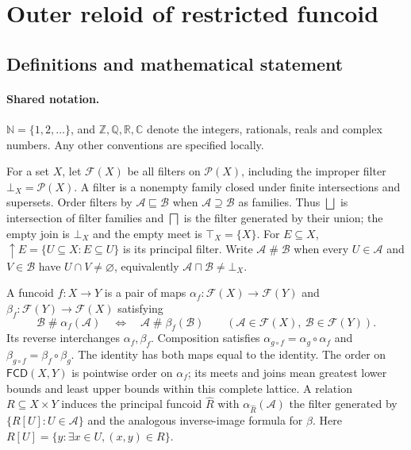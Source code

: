 \documentclass[11pt]{article}
\begin{document}
\section{Outer reloid of restricted funcoid}\label{statement}

\subsection{Definitions and mathematical statement}

\paragraph{Shared notation.}$\mathbb N=\{1,2,\ldots\}$, and $\mathbb Z,\mathbb Q,\mathbb R,\mathbb C$ denote the integers, rationals, reals and complex numbers. Any other conventions are specified locally.


For a set $X$, let $\mathcal F(X)$ be all filters on $\mathcal P(X)$, including the improper filter $\bot_X=\mathcal P(X)$. A filter is a nonempty family closed under finite intersections and supersets. Order filters by $\mathcal A\sqsubseteq\mathcal B$ when $\mathcal A\supseteq\mathcal B$ as families. Thus $\bigsqcup$ is intersection of filter families and $\bigsqcap$ is the filter generated by their union; the empty join is $\bot_X$ and the empty meet is $\top_X=\{X\}$. For $E\subseteq X$, $\uparrow E=\{U\subseteq X:E\subseteq U\}$ is its principal filter. Write $\mathcal A\mathrel{\#}\mathcal B$ when every $U\in\mathcal A$ and $V\in\mathcal B$ have $U\cap V\ne\varnothing$, equivalently $\mathcal A\sqcap\mathcal B\ne\bot_X$.

A funcoid $f:X\to Y$ is a pair of maps $\alpha_f:\mathcal F(X)\to\mathcal F(Y)$ and $\beta_f:\mathcal F(Y)\to\mathcal F(X)$ satisfying
\[
 \mathcal B\mathrel{\#}\alpha_f(\mathcal A)
 \quad\Longleftrightarrow\quad
 \mathcal A\mathrel{\#}\beta_f(\mathcal B)
 \qquad(\mathcal A\in\mathcal F(X),\ \mathcal B\in\mathcal F(Y)).
\]
Its reverse interchanges $\alpha_f,\beta_f$. Composition satisfies $\alpha_{g\circ f}=\alpha_g\circ\alpha_f$ and $\beta_{g\circ f}=\beta_f\circ\beta_g$. The identity has both maps equal to the identity. The order on $\mathsf{FCD}(X,Y)$ is pointwise order on $\alpha_f$; its meets and joins mean greatest lower bounds and least upper bounds within this complete lattice. A relation $R\subseteq X\times Y$ induces the principal funcoid $\widehat R$ with $\alpha_{\widehat R}(\mathcal A)$ the filter generated by $\{R[U]:U\in\mathcal A\}$ and the analogous inverse-image formula for $\beta$. Here $R[U]=\{y:\exists x\in U,(x,y)\in R\}$.
\end{document}
